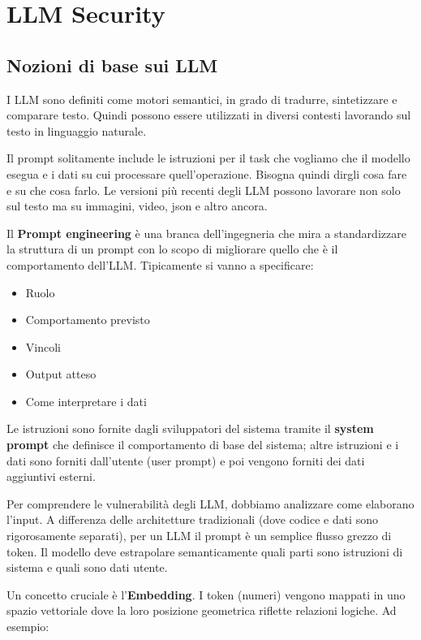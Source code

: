 \chapter{LLM Security}

\section{Nozioni di base sui LLM}

I LLM sono definiti come motori semantici, in grado di tradurre, sintetizzare 
e comparare testo. Quindi possono essere utilizzati in diversi contesti 
lavorando sul testo in linguaggio naturale.

Il prompt solitamente include le istruzioni per il task che vogliamo che 
il modello esegua e i dati su cui processare quell'operazione. Bisogna 
quindi dirgli cosa fare e su che cosa farlo. Le versioni più recenti degli 
LLM possono lavorare non solo sul testo ma su immagini, video, json e altro 
ancora.

Il \textbf{Prompt engineering} è una branca dell'ingegneria che mira a standardizzare 
la struttura di un prompt con lo scopo di migliorare quello che è il 
comportamento dell'LLM. Tipicamente si vanno a specificare:

\begin{itemize}
    \item Ruolo 
    \item Comportamento previsto 
    \item Vincoli 
    \item Output atteso 
    \item Come interpretare i dati
\end{itemize}

Le istruzioni sono fornite dagli sviluppatori del sistema tramite il \textbf{system prompt}
che definisce il comportamento di base del sistema; altre istruzioni e i dati sono forniti 
dall'utente (user prompt) e poi vengono forniti dei dati aggiuntivi esterni.

Per comprendere le vulnerabilità degli LLM, dobbiamo analizzare come elaborano 
l'input. A differenza delle architetture tradizionali (dove codice e dati sono 
rigorosamente separati), per un LLM il prompt è un semplice flusso grezzo 
di token. Il modello deve estrapolare semanticamente quali parti sono 
istruzioni di sistema e quali sono dati utente.

Un concetto cruciale è l'\textbf{Embedding}. I token (numeri) vengono mappati in uno spazio 
vettoriale dove la loro posizione geometrica riflette relazioni logiche. 
Ad esempio:

